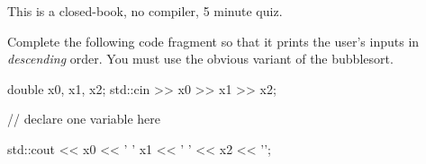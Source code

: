 

This is a closed-book, no compiler, 5 minute quiz.

\nextq
Complete the following code fragment so that it prints the
user's inputs in \textit{descending} order.
You must use the obvious variant of the bubblesort.
\\
\ANSWER
\begin{answercode}
double x0, x1, x2;
std::cin >> x0 >> x1 >> x2;

                          // declare one variable here

std::cout << x0 << ' ' x1 << ' ' << x2 << '\n';
\end{answercode}


